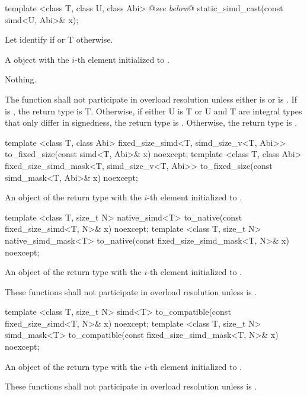 \begin{itemdecl}
template <class T, class U, class Abi> @\emph{see below}@ static_simd_cast(const simd<U, Abi>& x);
\end{itemdecl}
\begin{itemdescr}
  \pnum Let  identify  if  or \type T otherwise.

  \pnum\returns A \simd object with the $i$-th element initialized to .

  \pnum\throws Nothing.

  \pnum\remarks The function shall not participate in overload resolution unless either  is \false or  is \true.
  If  is \true, the return type is \type T.
  Otherwise, if either \type U is \type T or \type U and \type T are integral types that only differ in signedness, the return type is \simd[<T, Abi>].
  Otherwise, the return type is .
\end{itemdescr}

\begin{itemdecl}
template <class T, class Abi>
fixed_size_simd<T, simd_size_v<T, Abi>> to_fixed_size(const simd<T, Abi>& x) noexcept;
template <class T, class Abi>
fixed_size_simd_mask<T, simd_size_v<T, Abi>> to_fixed_size(const simd_mask<T, Abi>& x) noexcept;
\end{itemdecl}
\begin{itemdescr}
  \pnum\returns An object of the return type with the $i$-th element initialized to .
\end{itemdescr}

\begin{itemdecl}
template <class T, size_t N> native_simd<T> to_native(const fixed_size_simd<T, N>& x) noexcept;
template <class T, size_t N> native_simd_mask<T> to_native(const fixed_size_simd_mask<T, N>& x) noexcept;
\end{itemdecl}
\begin{itemdescr}
  \pnum\returns An object of the return type with the $i$-th element initialized to .

  \pnum\remarks These functions shall not participate in overload resolution unless  is \true.
\end{itemdescr}

\begin{itemdecl}
template <class T, size_t N> simd<T> to_compatible(const fixed_size_simd<T, N>& x) noexcept;
template <class T, size_t N> simd_mask<T> to_compatible(const fixed_size_simd_mask<T, N>& x) noexcept;
\end{itemdecl}
\begin{itemdescr}
  \pnum\returns An object of the return type with the $i$-th element initialized to .

  \pnum\remarks These functions shall not participate in overload resolution unless  is \true.
\end{itemdescr}

